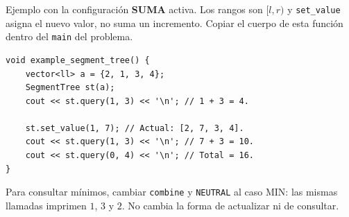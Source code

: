 Ejemplo con la configuraci\'on \textbf{SUMA} activa. Los rangos son $[l,r)$
y \texttt{set\_value} asigna el nuevo valor, no suma un incremento.
Copiar el cuerpo de esta funci\'on dentro del \texttt{main} del problema.

\begin{lstlisting}[style=cpp]
void example_segment_tree() {
    vector<ll> a = {2, 1, 3, 4};
    SegmentTree st(a);
    cout << st.query(1, 3) << '\n'; // 1 + 3 = 4.

    st.set_value(1, 7); // Actual: [2, 7, 3, 4].
    cout << st.query(1, 3) << '\n'; // 7 + 3 = 10.
    cout << st.query(0, 4) << '\n'; // Total = 16.
}
\end{lstlisting}

Para consultar m\'inimos, cambiar \texttt{combine} y \texttt{NEUTRAL} al
caso MIN: las mismas llamadas imprimen $1$, $3$ y $2$. No cambia la forma
de actualizar ni de consultar.
